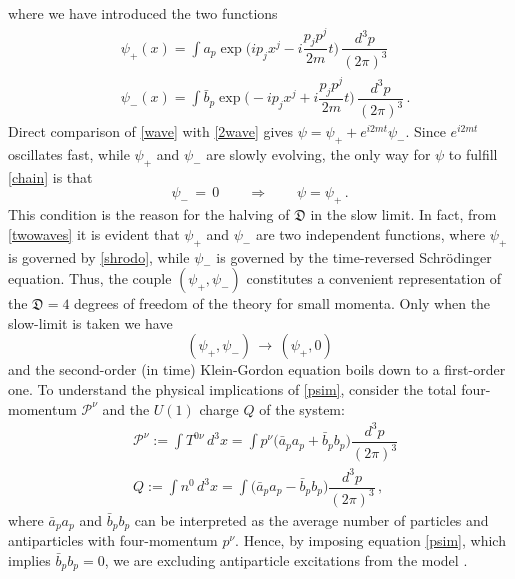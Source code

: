 \documentclass[a4paper, amsfonts, amssymb, amsmath, reprint, twocolumn, showkeys, nofootinbib]{revtex4-2}
\begin{document}
where we have introduced the two functions
\begin{equation}\label{twowaves}
\begin{split}
& \psi_+(x) =  \int  a_p \exp\bigg(i p_j x^j-i  \dfrac{p_j p^j}{2m} t \bigg) \, \dfrac{d^3p}{(2\pi)^3} \\
& \psi_-(x) = \int  \bar{b}_p \exp\bigg(-i p_j x^j + i  \dfrac{p_j p^j}{2m} t \bigg) \, \dfrac{d^3p}{(2\pi)^3}
\, . 
\end{split}
\end{equation}
Direct comparison of \eqref{wave} with \eqref{2wave} gives
$\psi = \psi_+ + e^{i2mt} \psi_-$.
Since $e^{i2mt}$ oscillates fast, while $\psi_+$ and $\psi_-$ are slowly evolving, the only way for $\psi$ to fulfill \eqref{chain} is that
\begin{equation}\label{psim}
\psi_- \, = \, 0    \qquad 
\Longrightarrow
\qquad \psi = \psi_+  \, .
\end{equation}
This condition is the reason for the halving of $\mathfrak{D}$ in the slow limit. 
In fact, from \eqref{twowaves} it is evident that $\psi_+$ and $\psi_-$ are two independent functions, where $\psi_+$ is governed by \eqref{shrodo}, while $\psi_-$ is governed by the time-reversed Schr\"{o}dinger equation. 
Thus, the couple $(\psi_+,\psi_-)$ constitutes a convenient representation of the $\mathfrak{D}=4$ degrees of freedom of the theory for small momenta. Only when the slow-limit is taken we have
\begin{equation}
(\psi_+,\psi_-) \, \longrightarrow \, (\psi_+,0)
\end{equation}
and the second-order (in time) Klein-Gordon equation boils down to a first-order one. 
%
To understand the physical implications of \eqref{psim}, consider the total four-momentum $\mathcal{P}^\nu $ and the $U(1)$ charge $Q$ of the system:
\begin{equation}\label{hinomkb}
\begin{split}
& \mathcal{P}^\nu :=\! \int T^{0\nu} \, d^3 x  
= \! \int p^\nu \big(\bar{a}_p a_p + \bar{b}_p b_p  \big)\dfrac{d^3p}{(2\pi)^3} 
\\
& Q :=\! \int n^{0} \, d^3 x 
 =\! \int \! \big(\bar{a}_p a_p - \bar{b}_p b_p  \big)\dfrac{d^3p}{(2\pi)^3} \, ,
 \end{split}
\end{equation}
where $\bar{a}_p a_p$ and $\bar{b}_p b_p$ can be interpreted as the average number of particles and antiparticles with four-momentum $p^\nu$. Hence, by imposing equation \eqref{psim}, which implies $\bar{b}_p b_p=0$, we are excluding antiparticle excitations from the model \citep{Heyen2020}. 
\end{document}
